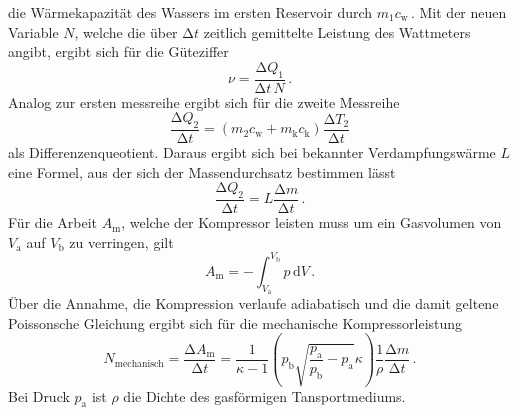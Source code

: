 die Wärmekapazität des Wassers im ersten Reservoir durch $m_1c_\text{w}$\,.
Mit der neuen Variable $N$, welche die über $\increment t$ zeitlich gemittelte Leistung des 
Wattmeters angibt, ergibt sich für die Güteziffer 
\begin{equation}
    \nu=\frac{\increment Q_1}{\increment t\,N}\,.
\end{equation}
Analog zur ersten messreihe ergibt sich für die zweite Messreihe
\begin{equation}
    \frac{\increment Q_2}{\increment t}=(m_2c_\text{w}+m_\text{k}c_\text{k})\frac{\increment T_2}{\increment t}
\end{equation}
als Differenzenqueotient. Daraus ergibt sich bei bekannter Verdampfungswärme $L$ eine Formel,
aus der sich der Massendurchsatz bestimmen lässt
\begin{equation}
    \frac{\increment Q_2}{\increment t}=L\frac{\increment m}{\increment t}\,.
\end{equation}
Für die Arbeit $A_\text{m}$, welche der Kompressor leisten muss um ein Gasvolumen von $V_\text{a}$
auf $V_\text{b}$ zu verringen, gilt 
\begin{equation}
    A_\text{m}=-\int_{V_\text{a}}^{V_\text{b}}p \,\text{d} V\,.
\end{equation}
Über die Annahme, die Kompression verlaufe adiabatisch und die damit geltene Poissonsche Gleichung
ergibt sich für die mechanische Kompressorleistung
\begin{equation}
N_\text{mechanisch}=\frac{\increment A_\text{m}}{\increment t}=\frac{1}{\kappa-1}\left(p_\text{b}
\sqrt{\frac{p_\text{a}}{p_\text{b}}-p_\text{a}}{\kappa}\right)\frac{1}{\rho}\frac{\increment m}{\increment t}\,.
\label{eq:mechanisch}
\end{equation}
Bei Druck $p_\text{a}$ ist $\rho$ die Dichte des gasförmigen Tansportmediums.

